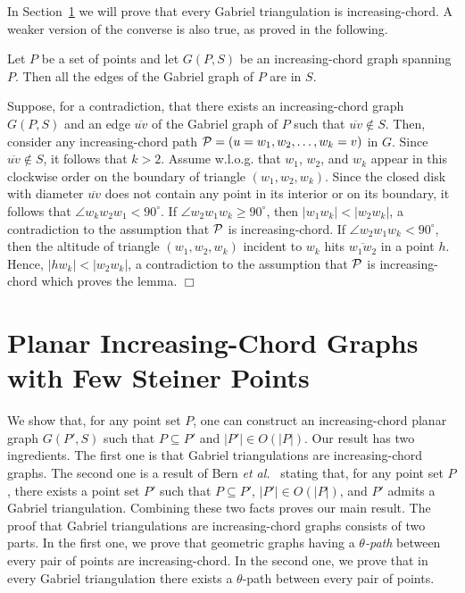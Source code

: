 \documentclass{llncs}
\renewenvironment{proof}
{{\bf Proof:}}{\hspace*{\fill}$\Box$\par\vspace{2mm}}
\begin{document}
In Section~\ref{se:steiner} we will prove that every Gabriel triangulation is increasing-chord. A weaker version of the converse is also true, as proved in the following.

\begin{lemma} \label{lemma:gabriel_edge_increasing_chord}
Let $P$ be a set of points and let $G(P,S)$ be an increasing-chord graph spanning $P$. Then all the edges of the Gabriel graph of $P$ are in $S$.
\end{lemma}

\begin{proof}
Suppose, for a contradiction, that there exists an increasing-chord graph $G(P,S)$ and an edge $\overline{uv}$ of the Gabriel graph of $P$ such that $\overline{uv}\notin S$. Then, consider any increasing-chord path ${\cal P}=(u=w_1,w_2,\dots,w_k=v)$ in $G$. Since $\overline{uv}\notin S$, it follows that $k>2$. Assume w.l.o.g. that $w_1$, $w_2$, and $w_k$ appear in this clockwise order on the boundary of triangle $(w_1,w_2,w_k)$. Since the closed disk with diameter $\overline{uv}$ does not contain any point in its interior or on its boundary, it follows that $\angle{w_k w_2 w_1}<90^\circ$. If $\angle{w_2 w_1 w_k}\geq 90^\circ$, then $|w_1w_k|<|w_2w_k|$, a contradiction to the assumption that ${\cal P}$ is increasing-chord. If $\angle{w_2w_1w_k}<90^\circ$, then the altitude of triangle $(w_1,w_2,w_k)$ incident to $w_k$ hits $\overline{w_1 w_2}$ in a point $h$. Hence, $|hw_k|<|w_2w_k|$, a contradiction to the assumption that ${\cal P}$ is increasing-chord which proves the lemma.
\end{proof}

\section{Planar Increasing-Chord Graphs with Few Steiner Points} \label{se:steiner}

We show that, for any point set $P$, one can construct an increasing-chord planar graph $G(P',S)$ such that $P\subseteq P'$ and $|P'|\in O(|P|)$. Our result has two ingredients. The first one is that Gabriel triangulations are increasing-chord graphs. The second one is a result of Bern {\em et al.}~\cite{beg-pgmg-94} stating that, for any point set $P$, there exists a point set $P'$ such that $P\subseteq P'$, $|P'|\in O(|P|)$, and $P'$ admits a Gabriel triangulation. Combining these two facts proves our main result. The proof that Gabriel triangulations are increasing-chord graphs consists of two parts. In the first one, we prove that geometric graphs having a {\em $\theta$-path} between every pair of points are increasing-chord. In the second one, we prove that in every Gabriel triangulation there exists a $\theta$-path between every pair of points.
\end{document}

